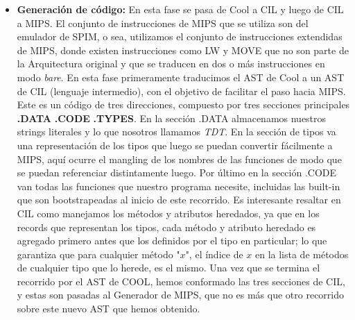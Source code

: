 \documentclass[a4paper, 12pt]{article}
\begin{document}
\begin{itemize}
\begin{itemize}
	\item Inferencia de tipos(Inferer): En este recorrido se realiza el chequeo de Tipos y
	adem\'as incorporamos inferencia de tipos al lenguage, feature que no est\'a contemplado
	en la definici\'on formal. Este recorrido visualiza el codigo de COOL como una gran expresi\'on
	y realiza un an\'alisi Bottom-Up, partiendo de tipos bien definidos de las expresiones en las hojas
	como enteros, strings, etc. Como paso extra, para inferir los tipos nos basamos en las mismas reglas
	semanticas de tipos, pero agregamos recorridos para resolver los problemas de dependencia que puedan surgir
	entre los elementos a inferir. Por ejemplo es posible que para inferir el valor de retorno de un m\'etodo, primero
	haya que inferir el valor de retorno de sus par\'ametros. Para esto se agrega un par\'ametro \textbf{deep} al visitor
	que determina la cantidad de veces que se recorre el AST, y por tanto, determina la profundidad de las dependencias
	que podemos resolver. Para marcar un atributo, par\'ametro, variable o m\'etodo para que el sistema de 
	inferencia intente inferir su tipo, basta con marcar su tipo como \textbf{AUTO\_TYPE}. En caso de que no se
	pueda inferir alg\'un tipo, entonces se lanza un error sem\'antico. 
	
\end{itemize}
\item \textbf{Generación de código:} En esta fase se pasa de Cool a CIL y luego de CIL a MIPS. 
El conjunto de instrucciones de MIPS que se utiliza son del emulador de SPIM, o sea, utilizamos el conjunto
de instrucciones extendidas de MIPS, donde existen instrucciones como LW y MOVE que no son parte de la Arquitectura
original y que se traducen en dos o m\'as instrucciones en modo \textit{bare}. En esta fase primeramente traducimos
el AST de Cool a un AST de CIL (lenguaje intermedio), con el objetivo de facilitar el paso hacia MIPS. Este es un c\'odigo
de tres direcciones, compuesto por tres secciones principales \textbf{.DATA} \textbf{.CODE} \textbf{.TYPES}.
En la secci\'on .DATA almacenamos nuestros strings literales y lo que nosotros llamamos \textit{TDT}. En la secci\'on
de tipos va una representaci\'on de los tipos que luego se puedan convertir f\'acilmente a MIPS, aqu\'i ocurre el mangling
de los nombres de las funciones de modo que se puedan referenciar distintamente luego. Por \'ultimo en la secci\'on
.CODE van todas las funciones que nuestro programa necesite, incluidas las built-in que son bootstrapeadas al
inicio de este recorrido. Es interesante resaltar en CIL como manejamos los m\'etodos y atributos heredados, ya
que en los records que representan los tipos, cada m\'etodo y atributo heredado es agregado primero antes que los definidos
por el tipo en particular; lo que garantiza que para cualquier m\'etodo "$x$", el \'indice de $x$ en la lista de m\'etodos
de cualquier tipo que lo herede, es el mismo. Una vez que se termina el recorrido por el AST de COOL, hemos conformado
las tres secciones de CIL, y estas son pasadas al Generador de MIPS, que no es m\'as que otro recorrido sobre este nuevo
AST que hemos obtenido.


\end{itemize}
\end{document}
